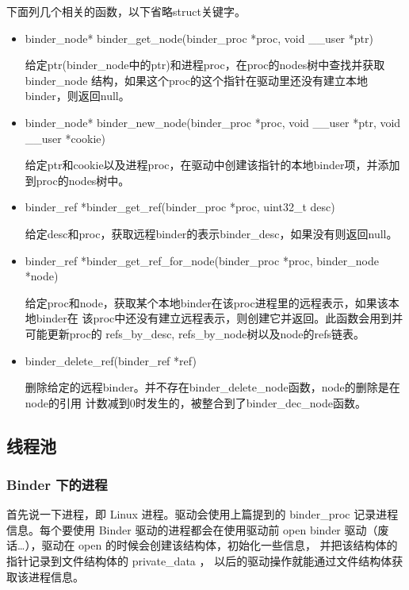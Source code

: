 \documentclass[a4paper,11pt]{article}
\begin{document}
下面列几个相关的函数，以下省略struct关键字。
\begin{itemize}
    \item binder_node* binder_get_node(binder_proc *proc, void __user *ptr)

        给定ptr(binder_node中的ptr)和进程proc，在proc的nodes树中查找并获取binder_node
        结构，如果这个proc的这个指针在驱动里还没有建立本地binder，则返回null。

    \item binder_node* binder_new_node(binder_proc *proc, void __user *ptr, void __user *cookie)

        给定ptr和cookie以及进程proc，在驱动中创建该指针的本地binder项，并添加到proc的nodes树中。

    \item binder_ref *binder_get_ref(binder_proc *proc, uint32_t desc)

        给定desc和proc，获取远程binder的表示binder_desc，如果没有则返回null。

    \item binder_ref *binder_get_ref_for_node(binder_proc *proc, binder_node *node)

        给定proc和node，获取某个本地binder在该proc进程里的远程表示，如果该本地binder在
        该proc中还没有建立远程表示，则创建它并返回。此函数会用到并可能更新proc的
        refs_by_desc, refs_by_node树以及node的refs链表。

    \item binder_delete_ref(binder_ref *ref)

        删除给定的远程binder。并不存在binder_delete_node函数，node的删除是在node的引用
        计数减到0时发生的，被整合到了binder_dec_node函数。
\end{itemize}



\subsection{线程池}
\subsubsection{Binder 下的进程}
首先说一下进程，即 Linux 进程。驱动会使用上篇提到的 binder_proc
记录进程信息。每个要使用 Binder 驱动的进程都会在使用驱动前 open binder
驱动（废话…），驱动在 open 的时候会创建该结构体，初始化一些信息，
并把该结构体的指针记录到文件结构体的 private_data ， 以后的驱动操作就能通过文件结构体获取该进程信息。
\end{document}
